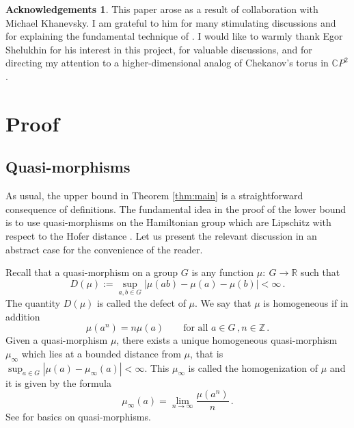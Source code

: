 \documentclass[11pt%
]{article}
\theoremstyle{definition}
\newtheorem*{acknow}{Acknowledgements}
\newcommand{\R}{{\mathbb{R}}}
\newcommand{\Z}{{\mathbb{Z}}}
\newcommand{\C}{{\mathbb{C}}}
\newcommand{\fc}{{:\ }}
\DeclareMathOperator{\0}{\operatorname{\mathbf{0}}}
\begin{document}
\begin{acknow}This paper arose as a result of collaboration with Michael Khanevsky. I am grateful to him for many stimulating discussions and for explaining the fundamental technique of \cite{Khanevsky_Hofers_Metric_Space_Diameters}. I would like to warmly thank Egor Shelukhin for his interest in this project, for valuable discussions, and for directing my attention to a higher-dimensional analog of Chekanov's torus in $\C P^2$.
\end{acknow}

\section{Proof}

\subsection{Quasi-morphisms}

As usual, the upper bound in Theorem \ref{thm:main} is a straightforward consequence of definitions. The fundamental idea in the proof of the lower bound is to use quasi-morphisms on the Hamiltonian group which are Lipschitz with respect to the Hofer distance \cite{Khanevsky_Hofers_Metric_Space_Diameters}. Let us present the relevant discussion in an abstract case for the convenience of the reader.

Recall that a quasi-morphism on a group $G$ is any function $\mu \fc G\to\R$ such that
$$D(\mu):=\sup_{a,b\in G}|\mu(ab) - \mu(a) - \mu(b)| < \infty\,.$$
The quantity $D(\mu)$ is called the defect of $\mu$. We say that $\mu$ is homogeneous if in addition
$$\mu(a^n) = n\mu(a)\qquad\text{for all }a\in G\,,n\in\Z\,.$$
Given a quasi-morphism $\mu$, there exists a unique homogeneous quasi-morphism $\mu_\infty$ which lies at a bounded distance from $\mu$, that is $\sup_{a\in G}|\mu(a)-\mu_{\infty}(a)| < \infty$. This $\mu_\infty$ is called the homogenization of $\mu$ and it is given by the formula
$$\mu_\infty(a) = \lim_{n\to\infty}\frac{\mu(a^n)}{n}\,.$$
See \cite{Calegari_scl} for basics on quasi-morphisms.
\end{document}
